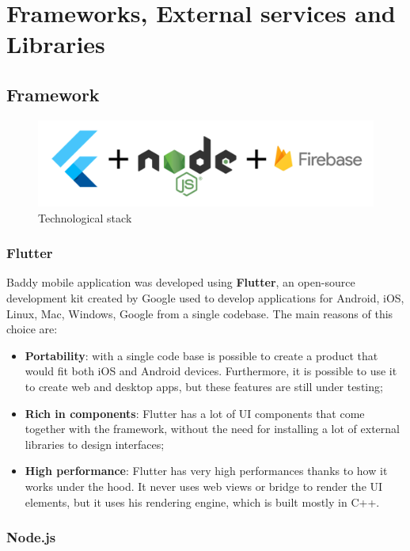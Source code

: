 \documentclass[../../dd.tex]{subfiles}
\begin{document}
    \chapter{Frameworks, External services and Libraries}
    \section{Framework}

    \begin{figure}[H]
        \centering
        \includegraphics[scale=0.6]{../../assets/technology.png}
        \caption{Technological stack}\label{fig:tech-stack}
    \end{figure}

    \subsection{Flutter}
    Baddy mobile application was developed using \textbf{Flutter}, an open-source development kit created by Google used to develop applications for Android, iOS, Linux, Mac, Windows, Google from a single codebase. The main reasons of this choice are:

    \begin{itemize}
        \item \textbf{Portability}: with a single code base is possible to create a product that would fit both iOS and Android devices. Furthermore, it is possible to use it to create web and desktop apps, but these features are still under testing;
        \item \textbf{Rich in components}: Flutter has a lot of UI components that come together with the framework, without the need for installing a lot of external libraries to design interfaces;
        \item \textbf{High performance}: Flutter has very high performances thanks to how it works under the hood. It never uses web views or bridge to render the UI elements, but it uses his rendering engine, which is built mostly in C++.
    \end{itemize}

    \subsection{Node.js}
\end{document}
